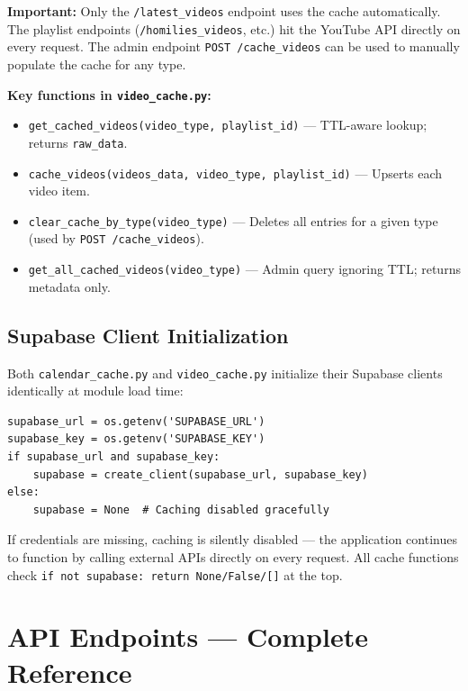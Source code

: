 \documentclass[12pt]{article}
\begin{document}
\textbf{Important:} Only the \texttt{/latest\_videos} endpoint uses the cache automatically. The playlist endpoints (\texttt{/homilies\_videos}, etc.) hit the YouTube API directly on every request. The admin endpoint \texttt{POST /cache\_videos} can be used to manually populate the cache for any type.

\textbf{Key functions in \texttt{video\_cache.py}:}
\begin{itemize}
    \item \texttt{get\_cached\_videos(video\_type, playlist\_id)} --- TTL-aware lookup; returns \texttt{raw\_data}.
    \item \texttt{cache\_videos(videos\_data, video\_type, playlist\_id)} --- Upserts each video item.
    \item \texttt{clear\_cache\_by\_type(video\_type)} --- Deletes all entries for a given type (used by \texttt{POST /cache\_videos}).
    \item \texttt{get\_all\_cached\_videos(video\_type)} --- Admin query ignoring TTL; returns metadata only.
\end{itemize}

\subsection{Supabase Client Initialization}

Both \texttt{calendar\_cache.py} and \texttt{video\_cache.py} initialize their Supabase clients identically at module load time:
\begin{lstlisting}[basicstyle=\ttfamily\footnotesize]
supabase_url = os.getenv('SUPABASE_URL')
supabase_key = os.getenv('SUPABASE_KEY')
if supabase_url and supabase_key:
    supabase = create_client(supabase_url, supabase_key)
else:
    supabase = None  # Caching disabled gracefully
\end{lstlisting}

If credentials are missing, caching is silently disabled --- the application continues to function by calling external APIs directly on every request. All cache functions check \texttt{if not supabase: return None/False/[]} at the top.

\section{API Endpoints --- Complete Reference}
\end{document}
